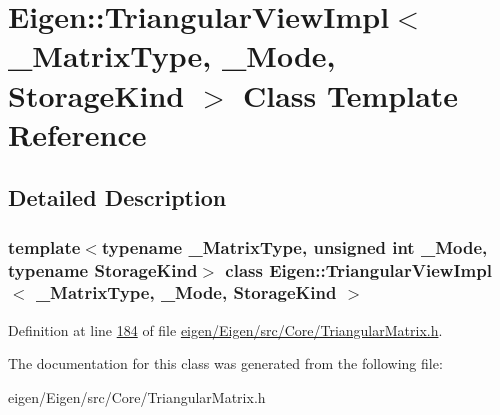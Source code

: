 \hypertarget{class_eigen_1_1_triangular_view_impl}{}\section{Eigen\+:\+:Triangular\+View\+Impl$<$ \+\_\+\+Matrix\+Type, \+\_\+\+Mode, Storage\+Kind $>$ Class Template Reference}
\label{class_eigen_1_1_triangular_view_impl}


\subsection{Detailed Description}
\subsubsection*{template$<$typename \+\_\+\+Matrix\+Type, unsigned int \+\_\+\+Mode, typename Storage\+Kind$>$\newline
class Eigen\+::\+Triangular\+View\+Impl$<$ \+\_\+\+Matrix\+Type, \+\_\+\+Mode, Storage\+Kind $>$}



Definition at line \hyperlink{eigen_2_eigen_2src_2_core_2_triangular_matrix_8h_source_l00184}{184} of file \hyperlink{eigen_2_eigen_2src_2_core_2_triangular_matrix_8h_source}{eigen/\+Eigen/src/\+Core/\+Triangular\+Matrix.\+h}.



The documentation for this class was generated from the following file\+:\begin{DoxyCompactItemize}
\item 
eigen/\+Eigen/src/\+Core/\+Triangular\+Matrix.\+h\end{DoxyCompactItemize}
